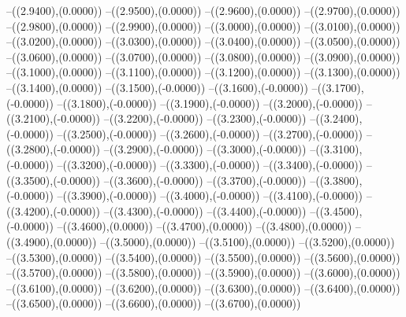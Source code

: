{	--({\sx*(2.9400)},{\sy*(0.0000)})
	--({\sx*(2.9500)},{\sy*(0.0000)})
	--({\sx*(2.9600)},{\sy*(0.0000)})
	--({\sx*(2.9700)},{\sy*(0.0000)})
	--({\sx*(2.9800)},{\sy*(0.0000)})
	--({\sx*(2.9900)},{\sy*(0.0000)})
	--({\sx*(3.0000)},{\sy*(0.0000)})
	--({\sx*(3.0100)},{\sy*(0.0000)})
	--({\sx*(3.0200)},{\sy*(0.0000)})
	--({\sx*(3.0300)},{\sy*(0.0000)})
	--({\sx*(3.0400)},{\sy*(0.0000)})
	--({\sx*(3.0500)},{\sy*(0.0000)})
	--({\sx*(3.0600)},{\sy*(0.0000)})
	--({\sx*(3.0700)},{\sy*(0.0000)})
	--({\sx*(3.0800)},{\sy*(0.0000)})
	--({\sx*(3.0900)},{\sy*(0.0000)})
	--({\sx*(3.1000)},{\sy*(0.0000)})
	--({\sx*(3.1100)},{\sy*(0.0000)})
	--({\sx*(3.1200)},{\sy*(0.0000)})
	--({\sx*(3.1300)},{\sy*(0.0000)})
	--({\sx*(3.1400)},{\sy*(0.0000)})
	--({\sx*(3.1500)},{\sy*(-0.0000)})
	--({\sx*(3.1600)},{\sy*(-0.0000)})
	--({\sx*(3.1700)},{\sy*(-0.0000)})
	--({\sx*(3.1800)},{\sy*(-0.0000)})
	--({\sx*(3.1900)},{\sy*(-0.0000)})
	--({\sx*(3.2000)},{\sy*(-0.0000)})
	--({\sx*(3.2100)},{\sy*(-0.0000)})
	--({\sx*(3.2200)},{\sy*(-0.0000)})
	--({\sx*(3.2300)},{\sy*(-0.0000)})
	--({\sx*(3.2400)},{\sy*(-0.0000)})
	--({\sx*(3.2500)},{\sy*(-0.0000)})
	--({\sx*(3.2600)},{\sy*(-0.0000)})
	--({\sx*(3.2700)},{\sy*(-0.0000)})
	--({\sx*(3.2800)},{\sy*(-0.0000)})
	--({\sx*(3.2900)},{\sy*(-0.0000)})
	--({\sx*(3.3000)},{\sy*(-0.0000)})
	--({\sx*(3.3100)},{\sy*(-0.0000)})
	--({\sx*(3.3200)},{\sy*(-0.0000)})
	--({\sx*(3.3300)},{\sy*(-0.0000)})
	--({\sx*(3.3400)},{\sy*(-0.0000)})
	--({\sx*(3.3500)},{\sy*(-0.0000)})
	--({\sx*(3.3600)},{\sy*(-0.0000)})
	--({\sx*(3.3700)},{\sy*(-0.0000)})
	--({\sx*(3.3800)},{\sy*(-0.0000)})
	--({\sx*(3.3900)},{\sy*(-0.0000)})
	--({\sx*(3.4000)},{\sy*(-0.0000)})
	--({\sx*(3.4100)},{\sy*(-0.0000)})
	--({\sx*(3.4200)},{\sy*(-0.0000)})
	--({\sx*(3.4300)},{\sy*(-0.0000)})
	--({\sx*(3.4400)},{\sy*(-0.0000)})
	--({\sx*(3.4500)},{\sy*(-0.0000)})
	--({\sx*(3.4600)},{\sy*(0.0000)})
	--({\sx*(3.4700)},{\sy*(0.0000)})
	--({\sx*(3.4800)},{\sy*(0.0000)})
	--({\sx*(3.4900)},{\sy*(0.0000)})
	--({\sx*(3.5000)},{\sy*(0.0000)})
	--({\sx*(3.5100)},{\sy*(0.0000)})
	--({\sx*(3.5200)},{\sy*(0.0000)})
	--({\sx*(3.5300)},{\sy*(0.0000)})
	--({\sx*(3.5400)},{\sy*(0.0000)})
	--({\sx*(3.5500)},{\sy*(0.0000)})
	--({\sx*(3.5600)},{\sy*(0.0000)})
	--({\sx*(3.5700)},{\sy*(0.0000)})
	--({\sx*(3.5800)},{\sy*(0.0000)})
	--({\sx*(3.5900)},{\sy*(0.0000)})
	--({\sx*(3.6000)},{\sy*(0.0000)})
	--({\sx*(3.6100)},{\sy*(0.0000)})
	--({\sx*(3.6200)},{\sy*(0.0000)})
	--({\sx*(3.6300)},{\sy*(0.0000)})
	--({\sx*(3.6400)},{\sy*(0.0000)})
	--({\sx*(3.6500)},{\sy*(0.0000)})
	--({\sx*(3.6600)},{\sy*(0.0000)})
	--({\sx*(3.6700)},{\sy*(0.0000)})
}
